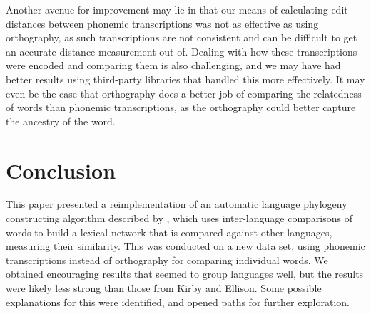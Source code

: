\documentclass[10pt,a4]{article}
\begin{document}
Another avenue for improvement may lie in that our means of calculating edit distances between phonemic transcriptions was not as effective as using orthography, as such transcriptions are not consistent and can be difficult to get an accurate distance measurement out of.  Dealing with how these transcriptions were encoded and comparing them is also challenging, and we may have had better results using third-party libraries that handled this more effectively.  It may even be the case that orthography does a better job of comparing the relatedness of words than phonemic transcriptions, as the orthography could better capture the ancestry of the word.

\section{Conclusion}

This paper presented a reimplementation of an automatic language phylogeny constructing algorithm described by , which uses inter-language comparisons of words to build a lexical network that is compared against other languages, measuring their similarity.  This was conducted on a new data set, using phonemic transcriptions instead of orthography for comparing individual words.  We obtained encouraging results that seemed to group languages well, but the results were likely less strong than those from Kirby and Ellison.  Some possible explanations for this were identified, and opened paths for further exploration.




\setlength{\bibleftmargin}{.125in}
\setlength{\bibindent}{-\bibleftmargin}


\end{document}
